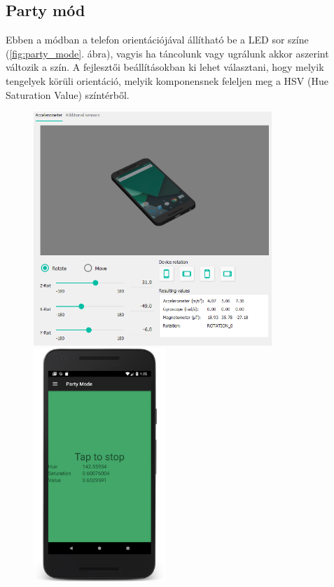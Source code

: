 \documentclass[../main.tex]{subfiles}
\begin{document}
        \subsection{Party mód}
            Ebben a módban a telefon orientációjával állítható be a LED sor színe (\ref{fig:party_mode}. ábra), vagyis ha táncolunk vagy ugrálunk akkor aszerint változik a szín. A fejlesztői beállításokban ki lehet választani, hogy 
            melyik tengelyek körüli orientáció, melyik komponensnek feleljen meg a HSV (Hue Saturation Value) színtérből.
            \begin{figure}[h!]
                \centering
                    \includegraphics[width=9cm]{android_res/screen_pictures/phone_orientation_01}
                    \includegraphics[width=5cm]{android_res/screen_pictures/phone_orientation_11}

\end{figure}
\end{document}
